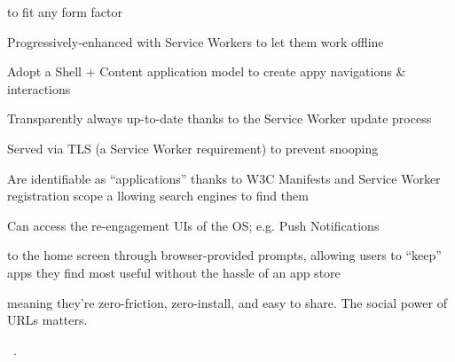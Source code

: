 \begin{description}[leftmargin=0.5cm,style=nextline]
    \item[Responsive] to fit any form factor
    \item[Connectivity independent] Progressively-enhanced with Service Workers to let them work offline
    \item[App-like-interactions] Adopt a Shell + Content application model to create appy navigations \& interactions
    \item[Fresh] Transparently always up-to-date thanks to the Service Worker update process
    \item[Safe] Served via TLS (a Service Worker requirement) to prevent snooping
    \item[Discoverable] Are identifiable as “applications” thanks to W3C Manifests and Service Worker registration scope a llowing search engines to find them
    \item[Re-engageable] Can access the re-engagement UIs of the OS; e.g. Push Notifications
    \item[Installable] to the home screen through browser-provided prompts, allowing users to “keep” apps they find most useful without the hassle of an app store
    \item[Linkable] meaning they’re zero-friction, zero-install, and easy to share. The social power of URLs matters.
\end{description}
~\cite{pwa}.
%
%
